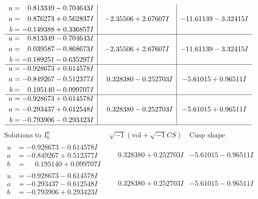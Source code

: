 \documentclass[1p]{elsarticle_modified}
\theoremstyle{definition}
\newcommand{\I}{\sqrt{-1}}
\begin{document}
$$\begin{array}{c|c|c}
\begin{aligned}
u &= \phantom{-}0.813349 - 0.704643 I \\
a &= \phantom{-}0.876273 + 0.562837 I \\
b &= -0.149388 + 0.336857 I\end{aligned}
 & -2.35506 + 2.67607 I & -11.61139 - 3.32415 I \\ \hline\begin{aligned}
u &= \phantom{-}0.813349 - 0.704643 I \\
a &= \phantom{-}0.039587 - 0.868673 I \\
b &= -0.189251 - 0.635297 I\end{aligned}
 & -2.35506 + 2.67607 I & -11.61139 - 3.32415 I \\ \hline\begin{aligned}
u &= -0.928673 + 0.614578 I \\
a &= -0.849267 - 0.512377 I \\
b &= \phantom{-}0.195140 - 0.099707 I\end{aligned}
 & \phantom{-}0.328380 - 0.252703 I & -5.61015 + 0.96511 I \\ \hline\begin{aligned}
u &= -0.928673 + 0.614578 I \\
a &= -0.293437 + 0.612548 I \\
b &= -0.793906 - 0.293423 I\end{aligned}
 & \phantom{-}0.328380 - 0.252703 I & -5.61015 + 0.96511 I\\
 \hline 
 \end{array}$$\newpage$$\begin{array}{c|c|c}  
\text{Solutions to }I^u_{6}& \I (\text{vol} + \sqrt{-1}CS) & \text{Cusp shape}\\
 \hline 
\begin{aligned}
u &= -0.928673 - 0.614578 I \\
a &= -0.849267 + 0.512377 I \\
b &= \phantom{-}0.195140 + 0.099707 I\end{aligned}
 & \phantom{-}0.328380 + 0.252703 I & -5.61015 - 0.96511 I \\ \hline\begin{aligned}
u &= -0.928673 - 0.614578 I \\
a &= -0.293437 - 0.612548 I \\
b &= -0.793906 + 0.293423 I\end{aligned}
 & \phantom{-}0.328380 + 0.252703 I & -5.61015 - 0.96511 I \\ \hline\begin{aligned}

\end{aligned}
\end{array}$$
\end{document}
